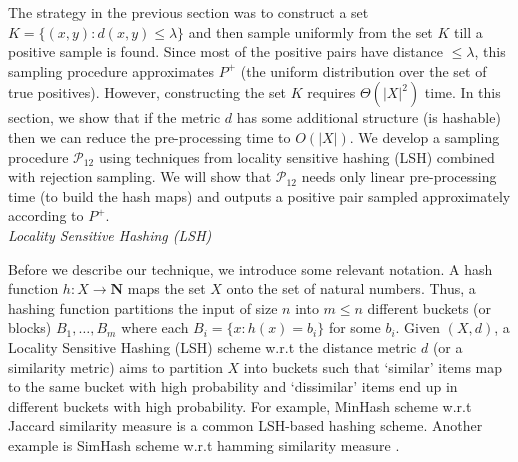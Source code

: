 \documentclass[12pt]{article}
\newcommand{\mb}{\mathbf}
\newcommand{\mc}{\mathcal}
\begin{document}
The strategy in the previous section was to construct a set $K = \{(x, y): d(x, y) \le \lambda\}$ and then sample uniformly from the set $K$ till a positive sample is found. Since most of the positive pairs have distance $\le \lambda$, this sampling procedure approximates $P^+$ (the uniform distribution over the set of true positives). However, constructing the set $K$ requires $\Theta(|X|^2)$ time. In this section, we show that if the metric $d$ has some additional structure (is hashable) then we can reduce the pre-processing time to $O(|X|)$. We develop a sampling procedure $\mc P_{12}$ using techniques from locality sensitive hashing (LSH) combined with rejection sampling. We will show that $\mc P_{12}$ needs only linear pre-processing time (to build the hash maps) and outputs a positive pair sampled approximately according to $P^+$.\\

\noindent\textit{Locality Sensitive Hashing (LSH)}

\vspace{0.02in}\noindent Before we describe our technique, we introduce some relevant notation. A hash function $h: X \rightarrow \mb N$ maps the set $X$ onto the set of natural numbers. Thus, a hashing function partitions the input of size $n$ into $m \le n$ different buckets (or blocks) $B_1, \ldots, B_m$ where each $B_i = \{x : h(x) = b_i\}$ for some $b_i$. Given $(X, d)$, a Locality Sensitive Hashing (LSH) scheme w.r.t the distance metric $d$ (or a similarity metric) aims to partition $X$ into buckets such that `similar' items map to the same bucket with high probability and `dissimilar' items end up in different buckets with high probability. For example, MinHash scheme w.r.t Jaccard similarity measure \cite{broder2000min, broder1997resemblance} is a common LSH-based hashing scheme. Another example is SimHash scheme w.r.t hamming similarity measure \cite{charikar2002similarity}. 
\end{document}
